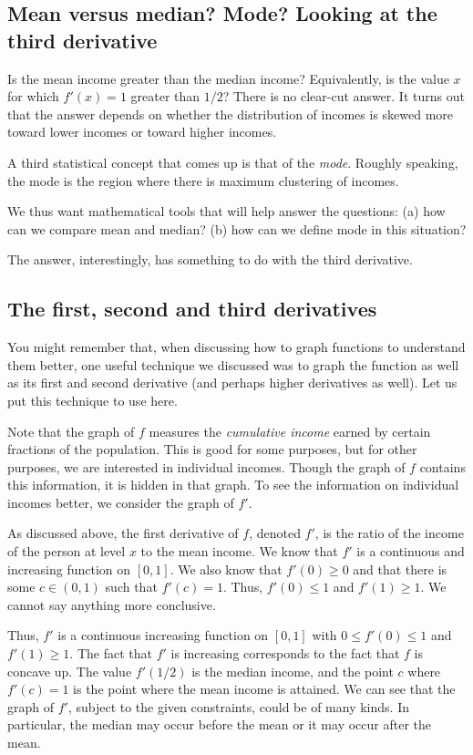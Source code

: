 \documentclass{amsart}
\begin{document}
\subsection*{Mean versus median? Mode? Looking at the third derivative}

Is the mean income greater than the median income? Equivalently, is
the value $x$ for which $f'(x) = 1$ greater than $1/2$? There is no
clear-cut answer. It turns out that the answer depends on whether the
distribution of incomes is skewed more toward lower incomes or toward
higher incomes.

A third statistical concept that comes up is that of the {\em
mode}. Roughly speaking, the mode is the region where there is maximum
clustering of incomes.

We thus want mathematical tools that will help answer the questions:
(a) how can we compare mean and median? (b) how can we define mode in
this situation?

The answer, interestingly, has something to do with the third
derivative.

\subsection*{The first, second and third derivatives}

You might remember that, when discussing how to graph functions to
understand them better, one useful technique we discussed was to graph
the function as well as its first and second derivative (and perhaps
higher derivatives as well). Let us put this technique to use here.

Note that the graph of $f$ measures the {\em cumulative income} earned
by certain fractions of the population. This is good for some
purposes, but for other purposes, we are interested in individual
incomes. Though the graph of $f$ contains this information, it is
hidden in that graph. To see the information on individual incomes
better, we consider the graph of $f'$.

As discussed above, the first derivative of $f$, denoted $f'$, is the
ratio of the income of the person at level $x$ to the mean income. We
know that $f'$ is a continuous and increasing function on $[0,1]$. We
also know that $f'(0) \ge 0$ and that there is some $c \in (0,1)$ such
that $f'(c) = 1$. Thus, $f'(0) \le 1$ and $f'(1) \ge 1$. We cannot say
anything more conclusive.

Thus, $f'$ is a continuous increasing function on $[0,1]$ with $0 \le
f'(0) \le 1$ and $f'(1) \ge 1$. The fact that $f'$ is increasing
corresponds to the fact that $f$ is concave up. The value $f'(1/2)$ is
the median income, and the point $c$ where $f'(c) = 1$ is the point
where the mean income is attained. We can see that the graph of $f'$,
subject to the given constraints, could be of many kinds. In
particular, the median may occur before the mean or it may occur after
the mean.
\end{document}
